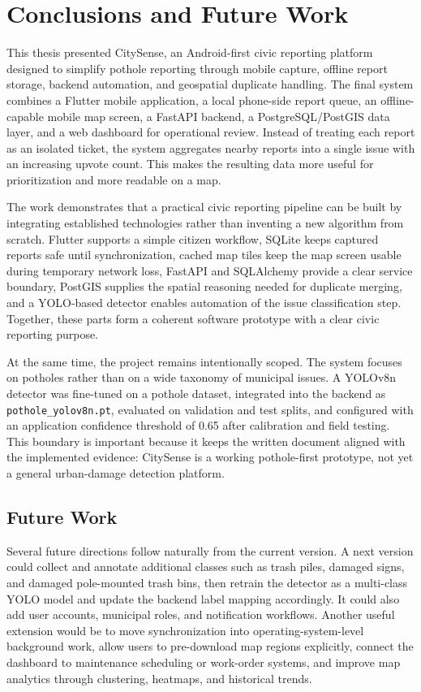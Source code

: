 \chapter{Conclusions and Future Work}
\label{conclusions}

This thesis presented CitySense, an Android-first civic reporting platform designed to simplify pothole reporting through mobile capture, offline report storage, backend automation, and geospatial duplicate handling. The final system combines a Flutter mobile application, a local phone-side report queue, an offline-capable mobile map screen, a FastAPI backend, a PostgreSQL/PostGIS data layer, and a web dashboard for operational review. Instead of treating each report as an isolated ticket, the system aggregates nearby reports into a single issue with an increasing upvote count. This makes the resulting data more useful for prioritization and more readable on a map.

The work demonstrates that a practical civic reporting pipeline can be built by integrating established technologies rather than inventing a new algorithm from scratch. Flutter supports a simple citizen workflow, SQLite keeps captured reports safe until synchronization, cached map tiles keep the map screen usable during temporary network loss, FastAPI and SQLAlchemy provide a clear service boundary, PostGIS supplies the spatial reasoning needed for duplicate merging, and a YOLO-based detector enables automation of the issue classification step. Together, these parts form a coherent software prototype with a clear civic reporting purpose.

At the same time, the project remains intentionally scoped. The system focuses on potholes rather than on a wide taxonomy of municipal issues. A YOLOv8n detector was fine-tuned on a pothole dataset, integrated into the backend as \texttt{pothole\_yolov8n.pt}, evaluated on validation and test splits, and configured with an application confidence threshold of 0.65 after calibration and field testing. This boundary is important because it keeps the written document aligned with the implemented evidence: CitySense is a working pothole-first prototype, not yet a general urban-damage detection platform.

\section{Future Work}

Several future directions follow naturally from the current version. A next version could collect and annotate additional classes such as trash piles, damaged signs, and damaged pole-mounted trash bins, then retrain the detector as a multi-class YOLO model and update the backend label mapping accordingly. It could also add user accounts, municipal roles, and notification workflows. Another useful extension would be to move synchronization into operating-system-level background work, allow users to pre-download map regions explicitly, connect the dashboard to maintenance scheduling or work-order systems, and improve map analytics through clustering, heatmaps, and historical trends.


